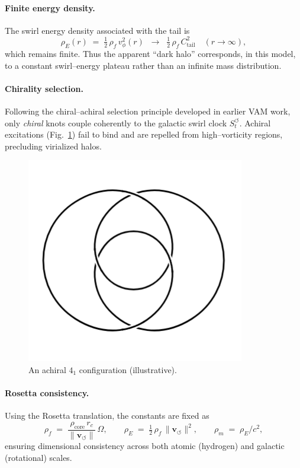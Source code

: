 \documentclass[reprint,aps,onecolumn,nofootinbib]{revtex4-2}
\newcommand{\rhof}{\rho_{\!f}}                           %
\newcommand{\rhocore}{\rho_{\mathrm{core}}}
\newcommand{\rc}{r_c}                                    %
\providecommand{\rc}{r_c}
\begin{document}
    \paragraph{Finite energy density.}
    The swirl energy density associated with the tail is
    \begin{equation}
        \rho_{\!E}(r) \;=\; \tfrac12\,\rhof\,v_\phi^2(r)
        \;\;\longrightarrow\;\; \tfrac12\,\rhof\,C_\text{tail}^2
        \quad (r\to\infty),
    \end{equation}
    which remains finite. Thus the apparent “dark halo” corresponds, in this model, to a constant swirl–energy plateau rather than an infinite mass distribution.

    \paragraph{Chirality selection.}
    Following the chiral–achiral selection principle developed in earlier VAM work, only \emph{chiral} knots couple coherently to the galactic swirl clock $S_t^{\boldsymbol{\circlearrowleft}}$. Achiral excitations (Fig.~\ref{fig:4-1}) fail to bind and are
    repelled from high–vorticity regions, precluding virialized halos.

    \begin{figure}[htbp]
      \centering
      \includegraphics[width=0.3\linewidth]{figures/4_1}
      \caption{An achiral \(4_1\) configuration (illustrative).}
      \label{fig:4-1}
    \end{figure}

    \paragraph{Rosetta consistency.}
    Using the Rosetta translation, the constants are fixed as
    \[
        \rhof \;=\; \frac{\rhocore\,\rc}{\lVert\mathbf{v}_{\!\boldsymbol{\circlearrowleft}}\rVert}\,\Omega,\qquad
        \rho_{\!E} \;=\; \tfrac12\,\rhof\,\lVert\mathbf{v}_{\!\boldsymbol{\circlearrowleft}}\rVert^2,\qquad
        \rho_{\!m} \;=\; \rho_{\!E}/c^2,
    \]
    ensuring dimensional consistency across both atomic (hydrogen) and galactic (rotational) scales.
\end{document}
